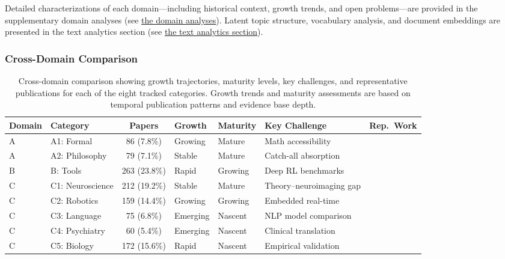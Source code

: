 \documentclass[
  english,
]{article}
\begin{document}
Detailed characterizations of each domain---including historical
context, growth trends, and open problems---are provided in the
supplementary domain analyses (see
\hyperref[sec:subfield_analyses]{the domain analyses}). Latent topic
structure, vocabulary analysis, and document embeddings are presented in
the text analytics section (see
\hyperref[sec:text_analytics]{the text analytics section}).

\subsubsection{Cross-Domain Comparison}\label{cross-domain-comparison}

\begin{table}[htbp]
\centering
\caption{Cross-domain comparison showing growth trajectories, maturity levels, key challenges, and representative publications for each of the eight tracked categories. Growth trends and maturity assessments are based on temporal publication patterns and evidence base depth.}
\label{tab:cross_domain_comparison}
\begin{tabular}{llcllll}
\toprule
\textbf{Domain} & \textbf{Category} & \textbf{Papers} & \textbf{Growth} & \textbf{Maturity} & \textbf{Key Challenge} & \textbf{Rep.\ Work} \\
\midrule
A & A1: Formal & 86 (7.8\%) & Growing & Mature & Math accessibility & \citep{sakthivadivel2023bayesian} \\
A & A2: Philosophy & 79 (7.1\%) & Stable & Mature & Catch-all absorption & \citep{friston2010free} \\
B & B: Tools & 263 (23.8\%) & Rapid & Growing & Deep RL benchmarks & \citep{fountas2020deep} \\
C & C1: Neuroscience & 212 (19.2\%) & Stable & Mature & Theory--neuroimaging gap & \citep{clark2013whatever} \\
C & C2: Robotics & 159 (14.4\%) & Growing & Growing & Embedded real-time & \citep{lanillos2021active} \\
C & C3: Language & 75 (6.8\%) & Emerging & Nascent & NLP model comparison & \citep{friston2020generative} \\
C & C4: Psychiatry & 60 (5.4\%) & Emerging & Nascent & Clinical translation & \citep{smith2021computational} \\
C & C5: Biology & 172 (15.6\%) & Rapid & Nascent & Empirical validation & \citep{kuchling2020morphogenesis} \\
\bottomrule
\end{tabular}
\end{table}
\end{document}
